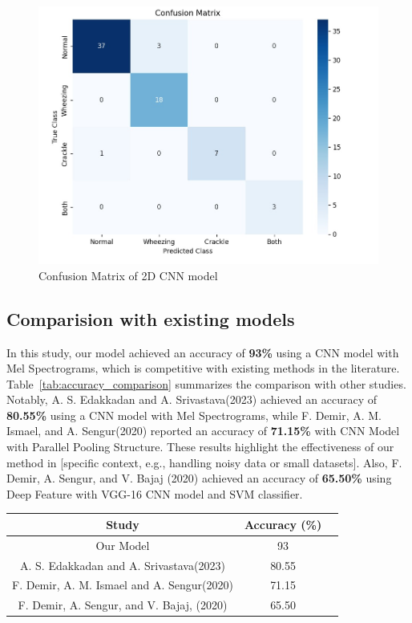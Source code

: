\documentclass[conference]{IEEEtran}
\begin{document}
{\begin{figure}
    \centering
    \includegraphics[width=0.8\linewidth]{Images/WhatsApp Image 2024-12-03 at 11.10.05 PM.jpeg}
    \caption{Confusion Matrix of 2D CNN model}
    \label{fig:spectral-gating}
\end{figure}

\subsection{Comparision with existing models}

In this study, our model achieved an accuracy of \textbf{93\%} using a CNN model with Mel Spectrograms, which is competitive with existing methods in the literature. Table~\ref{tab:accuracy_comparison} summarizes the comparison with other studies. Notably, A. S. Edakkadan and A. Srivastava(2023) achieved an accuracy of \textbf{80.55\%} using a CNN model with Mel Spectrograms, while  F. Demir, A. M. Ismael, and A. Sengur(2020) reported an accuracy of \textbf{71.15\%} with CNN Model with Parallel Pooling Structure. These results highlight the effectiveness of our method in [specific context, e.g., handling noisy data or small datasets]. Also, F. Demir, A. Sengur, and V. Bajaj (2020) achieved an accuracy of \textbf{65.50\%} using Deep Feature with VGG-16 CNN model and SVM classifier.

\begin{table}[h!]
\centering
\begin{tabular}{|c|c|c|}
\hline
\textbf{Study}                      & \textbf{Accuracy (\%)}            \\ \hline
Our Model                      & 93                                     \\ \hline
A. S. Edakkadan and A. Srivastava(2023)     &  80.55                  \\ \hline
F. Demir, A. M. Ismael and A. Sengur(2020)             & 71.15         \\ \hline
F. Demir, A. Sengur, and V. Bajaj, (2020)     &  65.50                  \\ \hline
 

\end{tabular}
\end{table}}
\end{document}
